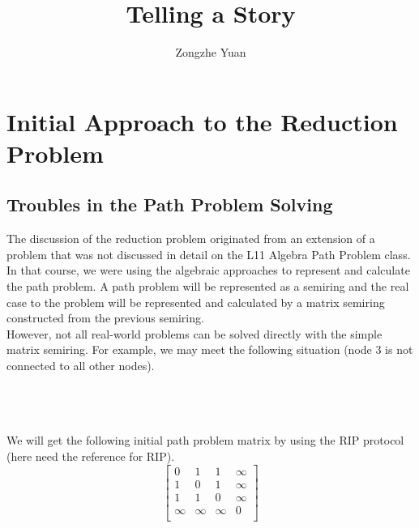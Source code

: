 \documentclass[a4paper,10pt]{article}
\title{Telling a Story}
\author{Zongzhe Yuan}
\begin{document}
\maketitle

\section{Initial Approach to the Reduction Problem}
\subsection{Troubles in the Path Problem Solving}
The discussion of the reduction problem originated from an extension of a problem that was not discussed in detail on the L11 Algebra Path Problem class. \\
In that course, we were using the algebraic approaches to represent and calculate the path problem. A path problem will be represented as a semiring and the real case to the problem will be represented and calculated by a matrix semiring constructed from the previous semiring.\\
However, not all real-world problems can be solved directly with the simple matrix semiring. 
For example, we may meet the following situation (node 3 is not connected to all other nodes).\\\\
\\\\
We will get the following initial path problem matrix by using the RIP protocol (here need the reference for RIP).
\[
\begin{bmatrix}
    0 & 1 & 1 & \infty \\
    1 & 0 & 1 & \infty \\
    1 & 1 & 0 & \infty \\
    \infty & \infty & \infty & 0 \\
\end{bmatrix}
\]\\
\end{document}
